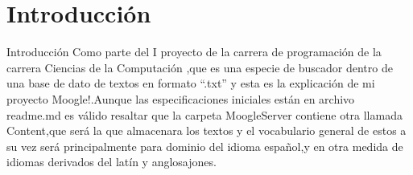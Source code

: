 \section{Introducci\'on}\label{intro}
\begin {center}
\begin{block}{Introducci\'on}
  Como parte del I proyecto de la carrera de programación de la carrera Ciencias
de la Computación ,que es una especie de buscador dentro de una base de dato
de textos en formato “.txt” y esta es la explicación de mi proyecto Moogle!.Aunque las especificaciones iniciales están en archivo  readme.md es v\'alido resaltar que la carpeta
MoogleServer contiene otra llamada Content,que será la que almacenara los
textos y el vocabulario general de estos a  su vez será principalmente para
dominio del idioma español,y  en otra medida de idiomas derivados del latín y
anglosajones.
\end{block}


\end{center}

